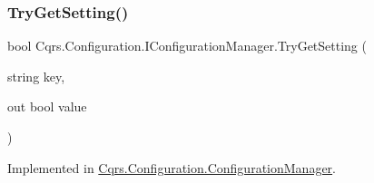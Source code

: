 \subsubsection{\texorpdfstring{Try\+Get\+Setting()}{TryGetSetting()}\hspace{0.1cm}{\footnotesize\ttfamily [2/2]}}
{\footnotesize\ttfamily bool Cqrs.\+Configuration.\+I\+Configuration\+Manager.\+Try\+Get\+Setting (\begin{DoxyParamCaption}\item[{string}]{key,  }\item[{out bool}]{value }\end{DoxyParamCaption})}



Implemented in \hyperlink{classCqrs_1_1Configuration_1_1ConfigurationManager_a40810d0b9fd2f3d1c4a270681e908c84}{Cqrs.\+Configuration.\+Configuration\+Manager}.

